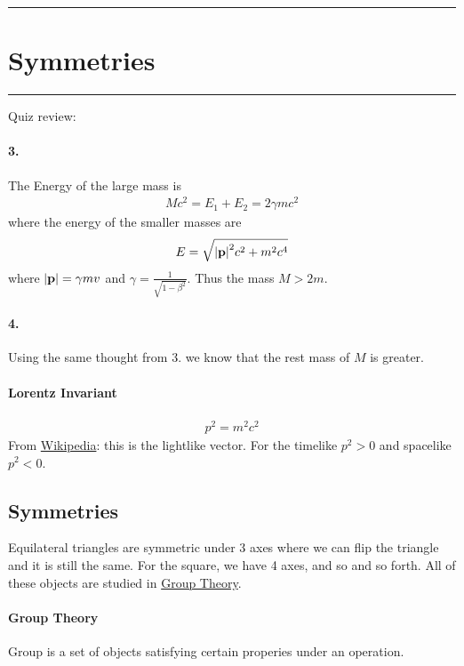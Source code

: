 \documentclass[../main.tex]{subfiles}
\begin{document}
\hrule
\section{Symmetries}
\hrule \vspace{10px}


Quiz review:

\paragraph{3.} The Energy of the large mass is 
\begin{align*}
    Mc^2 = E_1 + E_2 = 2\gamma m c^2
\end{align*}
where the energy of the smaller masses are
\begin{align*}
    E = \sqrt{\abs{\vb{p}}^2 c^2 + m^2 c^4} 
\end{align*}
where $\abs{\vb{p}} = \gamma mv$ and $\gamma = \frac{1}{\sqrt{1 - \beta^2}}$. Thus the mass $M >2m$.

\paragraph{4.} Using the same thought from 3. we know that the rest mass of $M$ is greater.

\paragraph{Lorentz Invariant}
\begin{align*}
    p^2 = m^2 c^2
\end{align*}
From \href{https://en.wikipedia.org/wiki/Minkowski_space}{Wikipedia}: this is the lightlike vector.
For the timelike $p^2 > 0$ and spacelike $p^2 < 0$.

\subsection*{Symmetries}

Equilateral triangles are symmetric under 3 axes where we can flip the triangle and it is still the
same. For the square, we have 4 axes, and so and so forth. All of these objects are studied in
\href{https://en.wikipedia.org/wiki/Group_theory}{Group Theory}.

\paragraph{Group Theory} Group is a set of objects satisfying certain properies under an operation.
\end{document}
